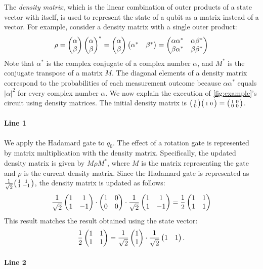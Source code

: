 \noindent
The \emph{density matrix}, which is the linear combination of outer products of
a state vector with itself, is used to represent the state of a qubit as a
matrix instead of a vector. For example, consider a density matrix with a
single outer product:
%
\[
	\rho
	=\begin{pmatrix}\alpha\\\beta\end{pmatrix}\begin{pmatrix}\alpha\\\beta\end{pmatrix}^*
	=\begin{pmatrix}\alpha\\\beta\end{pmatrix}\begin{pmatrix}\alpha^*&\beta^*\end{pmatrix}
	=\begin{pmatrix}\alpha\alpha^*&\alpha\beta^*\\\beta\alpha^*&\beta\beta^*\end{pmatrix}
\]
%
Note that $\alpha^*$ is the complex conjugate of a complex number $\alpha$, and
$M^*$ is the conjugate transpose of a matrix $M$.
%
The diagonal elements of a density matrix correspond to the probabilities of
each measurement outcome because $\alpha\alpha^*$ equals $|\alpha|^2$ for every
complex number $\alpha$.
%
We now explain the execution of \cref{fig:example}'s circuit using density
matrices.
%
The initial density matrix is $\big(\begin{smallmatrix}1\\0\end{smallmatrix}\big)\big(\begin{smallmatrix}1&0\end{smallmatrix}\big)=\big(\begin{smallmatrix}1&0\\0&0\end{smallmatrix}\big)$.

\paragraph{Line 1}

We apply the Hadamard gate to $q_0$.
%
The effect of a rotation gate is represented by matrix multiplication with the
density matrix.
%
Specifically, the updated density matrix is given by $M\rho M^*$, where $M$ is
the matrix representing the gate and $\rho$ is the current density matrix.
%
Since the Hadamard gate is represented as
$\frac{1}{\sqrt{2}}\big(\begin{smallmatrix}1&1\\1&-1\end{smallmatrix}\big)$, the density matrix is updated as
follows:
%
\[
	\frac{1}{\sqrt{2}}\begin{pmatrix}1&1\\1&-1\end{pmatrix}\cdot\begin{pmatrix}1&0\\0&0\end{pmatrix}\cdot\frac{1}{\sqrt{2}}\begin{pmatrix}1&1\\1&-1\end{pmatrix}
	=\frac{1}{2}\begin{pmatrix}1&1\\1&1\end{pmatrix}
\]
%
This result matches the result obtained using the state vector:
%
\[
	\frac{1}{2}\begin{pmatrix}1&1\\1&1\end{pmatrix}=\frac{1}{\sqrt{2}}\begin{pmatrix}1\\1\end{pmatrix}\cdot\frac{1}{\sqrt{2}}\begin{pmatrix}1&1\end{pmatrix}.
\]

\paragraph{Line 2}

